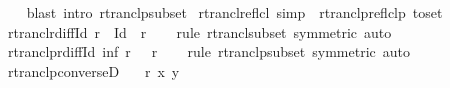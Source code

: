 \begin{isabellebody}
\isadelimproof
\ \ %
\endisadelimproof
%
\isatagproof
{}\isamarkupfalse%
\ {\isacharparenleft}{\kern0pt}blast\ intro{\isacharbang}{\kern0pt}{\isacharcolon}{\kern0pt}\ rtranclp{\isacharunderscore}{\kern0pt}subset{\isacharparenright}{\kern0pt}%
\endisatagproof
{\isafoldproof}%
%
\isadelimproof
\isanewline
%
\endisadelimproof
\isanewline
{}\isamarkupfalse%
\ rtrancl{\isacharunderscore}{\kern0pt}reflcl\ {\isacharbrackleft}{\kern0pt}simp{\isacharbrackright}{\kern0pt}\ {\isacharequal}{\kern0pt}\ rtranclp{\isacharunderscore}{\kern0pt}reflclp\ {\isacharbrackleft}{\kern0pt}to{\isacharunderscore}{\kern0pt}set{\isacharbrackright}{\kern0pt}\isanewline
\isanewline
{}\isamarkupfalse%
\ rtrancl{\isacharunderscore}{\kern0pt}r{\isacharunderscore}{\kern0pt}diff{\isacharunderscore}{\kern0pt}Id{\isacharcolon}{\kern0pt}\ {\isachardoublequoteopen}{\isacharparenleft}{\kern0pt}r\ {\isacharminus}{\kern0pt}\ Id{\isacharparenright}{\kern0pt}\isactrlsup {\isacharasterisk}{\kern0pt}\ {\isacharequal}{\kern0pt}\ r\isactrlsup {\isacharasterisk}{\kern0pt}{\isachardoublequoteclose}\isanewline
%
\isadelimproof
\ \ %
\endisadelimproof
%
\isatagproof
{}\isamarkupfalse%
\ {\isacharparenleft}{\kern0pt}rule\ rtrancl{\isacharunderscore}{\kern0pt}subset\ {\isacharbrackleft}{\kern0pt}symmetric{\isacharbrackright}{\kern0pt}{\isacharparenright}{\kern0pt}\ auto%
\endisatagproof
{\isafoldproof}%
%
\isadelimproof
\isanewline
%
\endisadelimproof
\isanewline
{}\isamarkupfalse%
\ rtranclp{\isacharunderscore}{\kern0pt}r{\isacharunderscore}{\kern0pt}diff{\isacharunderscore}{\kern0pt}Id{\isacharcolon}{\kern0pt}\ {\isachardoublequoteopen}{\isacharparenleft}{\kern0pt}inf\ r\ {\isacharparenleft}{\kern0pt}{\isasymnoteq}{\isacharparenright}{\kern0pt}{\isacharparenright}{\kern0pt}\isactrlsup {\isacharasterisk}{\kern0pt}\isactrlsup {\isacharasterisk}{\kern0pt}\ {\isacharequal}{\kern0pt}\ r\isactrlsup {\isacharasterisk}{\kern0pt}\isactrlsup {\isacharasterisk}{\kern0pt}{\isachardoublequoteclose}\isanewline
%
\isadelimproof
\ \ %
\endisadelimproof
%
\isatagproof
{}\isamarkupfalse%
\ {\isacharparenleft}{\kern0pt}rule\ rtranclp{\isacharunderscore}{\kern0pt}subset\ {\isacharbrackleft}{\kern0pt}symmetric{\isacharbrackright}{\kern0pt}{\isacharparenright}{\kern0pt}\ auto%
\endisatagproof
{\isafoldproof}%
%
\isadelimproof
\isanewline
%
\endisadelimproof
\isanewline
{}\isamarkupfalse%
\ rtranclp{\isacharunderscore}{\kern0pt}converseD{\isacharcolon}{\kern0pt}\isanewline
\ \ \ {\isachardoublequoteopen}{\isacharparenleft}{\kern0pt}r{\isasyminverse}{\isasyminverse}{\isacharparenright}{\kern0pt}\isactrlsup {\isacharasterisk}{\kern0pt}\isactrlsup {\isacharasterisk}{\kern0pt}\ x\ y{\isachardoublequoteclose}\isanewline

\end{isabellebody}
